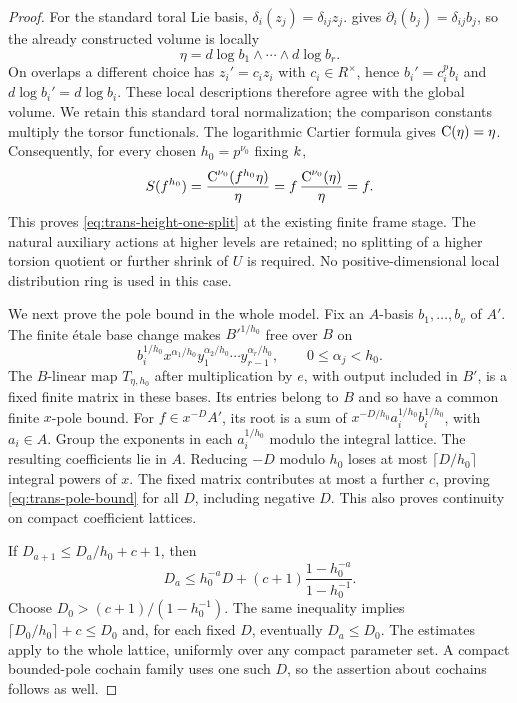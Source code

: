 \begin{proof}
For the standard toral Lie basis,
$\delta_i(z_j)=\delta_{ij}z_j$.  gives
$\partial_i(b_j)=\delta_{ij}b_j$, so the already constructed volume
is locally
\[
 \eta=d\log b_1\wedge\cdots\wedge d\log b_r.
\]
On overlaps a different choice has $z_i'=c_i z_i$ with
$c_i\in R^\times$, hence $b_i'=c_i^p b_i$ and
$d\log b_i'=d\log b_i$. These local descriptions therefore agree
with the global volume. We retain this standard toral normalization;
the comparison constants multiply the torsor functionals.
The logarithmic Cartier formula gives $\operatorname{C}(\eta)=\eta$.
Consequently, for every chosen $h_0=p^{\nu_0}$ fixing $k$,
\[
 S(f^{h_0})
   =\frac{\operatorname{C}^{\nu_0}(f^{h_0}\eta)}{\eta}
   =f\,\frac{\operatorname{C}^{\nu_0}(\eta)}{\eta}
   =f.
\]
This proves \cref{eq:trans-height-one-split} at the existing finite
frame stage. The natural auxiliary actions at higher levels are
retained; no splitting of a higher torsion quotient or further
shrink of $U$ is required. No positive-dimensional local distribution
ring is used in this case.

We next prove the pole bound in the whole model.  Fix an $A$-basis
$b_1,\ldots,b_v$ of $A'$.  The finite \'{e}tale base change makes
$B'^{1/h_0}$ free over $B$ on
\[
 b_i^{1/h_0}x^{\alpha_1/h_0}
     y_1^{\alpha_2/h_0}\cdots y_{r-1}^{\alpha_r/h_0},
 \qquad 0\leq\alpha_j<h_0.
\]
The $B$-linear map $T_{\eta,h_0}$ after multiplication by $e$, with
output included in $B'$, is a fixed finite matrix in these bases.
Its entries belong to $B$ and so have a common finite $x$-pole bound.
For $f\in x^{-D}A'$, its root is a sum of
$x^{-D/h_0}a_i^{1/h_0}b_i^{1/h_0}$, with $a_i\in A$.
Group the exponents in each $a_i^{1/h_0}$ modulo the integral lattice.
The resulting coefficients lie in $A$.  Reducing $-D$ modulo $h_0$
loses at most $\lceil D/h_0\rceil$ integral powers of $x$.
The fixed matrix contributes at most a further $c$, proving
\cref{eq:trans-pole-bound} for all $D$, including negative $D$.
This also proves continuity on compact coefficient lattices.

If $D_{a+1}\leq D_a/h_0+c+1$, then
\[
 D_a\leq h_0^{-a}D+(c+1)\frac{1-h_0^{-a}}{1-h_0^{-1}}.
\]
Choose $D_0>(c+1)/(1-h_0^{-1})$.  The same inequality implies
$\lceil D_0/h_0\rceil+c\leq D_0$ and, for each fixed $D$, eventually
$D_a\leq D_0$.  The estimates apply to the whole lattice, uniformly
over any compact parameter set.  A compact bounded-pole cochain
family uses one such $D$, so the assertion about cochains follows as
well.


\end{proof}
